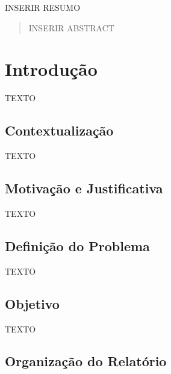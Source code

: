 \documentclass{bcc}
\begin{document}

\capa


\begin{resumo}
INSERIR RESUMO
\end{resumo}

\begin{abstract}
INSERIR ABSTRACT
\end{abstract}

\renewcommand\contentsname{\centerline{Sumário}}
\renewcommand\listfigurename{\centerline{Lista de Figuras}}
\renewcommand\listtablename{\centerline{Lista de Tabelas}}

\tableofcontents

\listoffigures
{}

\listoftables
{}

\inicio
\chapter{Introdução}

TEXTO


\section {Contextualização}

TEXTO

\section{Motivação e Justificativa}

TEXTO


\section{Definição do Problema}

TEXTO

\section{Objetivo}

TEXTO

\section{Organização do Relatório}
\end{document}
